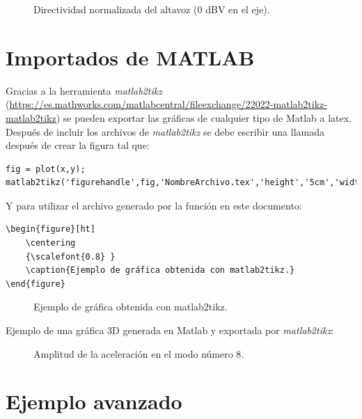 \begin{figure}[H]
    	\centering%
         {%
    }
    \caption{Directividad normalizada del altavoz (0 dBV en el eje).}\label{norma}
\end{figure}


\section{Importados de MATLAB}
\label{impmatlab}
Gracias a la herramienta \textit{matlab2tikz} (\url{https://es.mathworks.com/matlabcentral/fileexchange/22022-matlab2tikz-matlab2tikz}) se pueden exportar las gráficas de cualquier tipo de Matlab a latex.
Después de incluir los archivos de \textit{matlab2tikz} se debe escribir una llamada después de crear la figura tal que:

\begin{lstlisting}[style=Matlab-color,caption={Ejemplo de llamada a matlab2tikz}]
fig = plot(x,y);
matlab2tikz('figurehandle',fig,'NombreArchivo.tex','height','5cm','width','13.5cm','strict',true,'showHiddenStrings',true,'showInfo',false)
\end{lstlisting}

Y para utilizar el archivo generado por la función en este documento:
\begin{lstlisting}[style=Latex-color]
\begin{figure}[ht]
	\centering
	{\scalefont{0.8} }
	\caption{Ejemplo de gráfica obtenida con matlab2tikz.}
\end{figure}
\end{lstlisting}

\begin{figure}[ht]
	\centering
	{ }
	\caption{Ejemplo de gráfica obtenida con matlab2tikz.}
\end{figure}
\FloatBarrier
Ejemplo de una gráfica 3D generada en Matlab y exportada por \textit{matlab2tikz}:
\begin{figure}[ht]
		\centering
		{ }
		\caption{Amplitud de la aceleración en el modo número 8.}
\end{figure}
\FloatBarrier

\section{Ejemplo avanzado}

